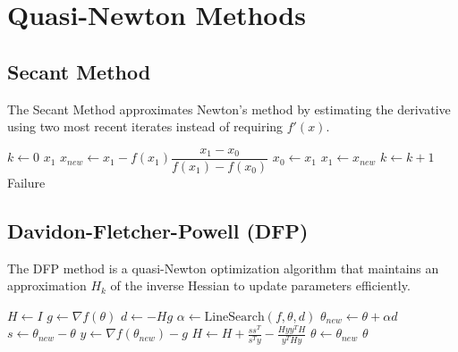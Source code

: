 \section{Quasi-Newton Methods}

\subsection{Secant Method}

  \begin{algo}
    The Secant Method approximates Newton's method by estimating the derivative using two most recent iterates instead of requiring $f'(x)$. 
    \begin{algorithm}[H]
    \label{alg:secant}
    \begin{algorithmic}[1]

        \State $k \gets 0$
            \State \Return $x_1$
          \EndIf
          \State $x_{new} \gets x_1 - f(x_1)\dfrac{x_1 - x_0}{f(x_1) - f(x_0)}$
          \State $x_0 \gets x_1$
          \State $x_1 \gets x_{new}$
          \State $k \gets k + 1$
        \EndWhile
        \State \Return Failure
      \EndProcedure
    \end{algorithmic}
    \end{algorithm}
  \end{algo}

\subsection{Davidon-Fletcher-Powell (DFP)}

  \begin{algo}
    The DFP method is a quasi-Newton optimization algorithm that maintains an approximation $H_k$ of the inverse Hessian to update parameters efficiently. 
    \begin{algorithm}[H]
    \label{alg:dfp}
    \begin{algorithmic}[1]

        \State $H \gets I$ 
          \State $g \gets \nabla f(\theta)$
          \State $d \gets -H g$
          \State $\alpha \gets \text{LineSearch}(f, \theta, d)$
          \State $\theta_{new} \gets \theta + \alpha d$
          \State $s \gets \theta_{new} - \theta$
          \State $y \gets \nabla f(\theta_{new}) - g$
          \State $H \gets H + \frac{ss^T}{s^T y} - \frac{Hy y^T H}{y^T H y}$
          \State $\theta \gets \theta_{new}$
        \EndWhile
        \State \Return $\theta$
      \EndProcedure
    \end{algorithmic}
    \end{algorithm}
  \end{algo}

